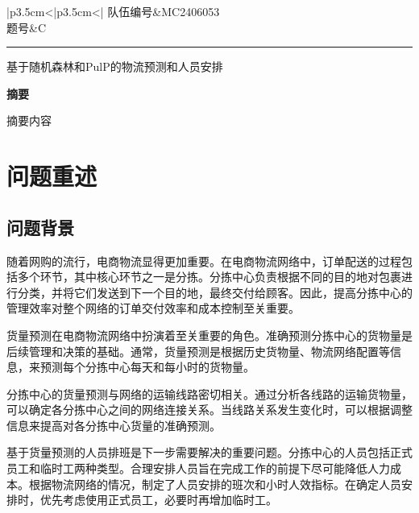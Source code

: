 \documentclass[UTF8,a4paper,10 pt]{article}%
\begin{document}
	\setlength{\lineskip}{8pt}
	\setlength{\lineskiplimit}{8pt}
    
\begin{table}[!ht]
    \renewcommand\arraystretch{1.5}
    \centering  
    \begin{tabular}{|p{3.5cm}<{\centering}|p{3.5cm}<{\centering}|}
        \hline
        {队伍编号}&MC2406053\\
        \hline
        题号&C\\
        \hline        
    \end{tabular}
\end{table}

\setcounter{page}{1}

\noindent\rule{\linewidth}{1pt}
\begin{center}
    \Large 基于随机森林和PulP的物流预测和人员安排
\end{center}
\begin{center}
    \large\bf 摘要
\end{center}

摘要内容



\newpage

\tableofcontents


\newpage
\setcounter{page}{1}


\section{问题重述}
\subsection{问题背景}
随着网购的流行，电商物流显得更加重要。在电商物流网络中，订单配送的过程包括多个环节，其中核心环节之一是分拣。分拣中心负责根据不同的目的地对包裹进行分类，并将它们发送到下一个目的地，最终交付给顾客。因此，提高分拣中心的管理效率对整个网络的订单交付效率和成本控制至关重要。

货量预测在电商物流网络中扮演着至关重要的角色。准确预测分拣中心的货物量是后续管理和决策的基础。通常，货量预测是根据历史货物量、物流网络配置等信息，来预测每个分拣中心每天和每小时的货物量。

分拣中心的货量预测与网络的运输线路密切相关。通过分析各线路的运输货物量，可以确定各分拣中心之间的网络连接关系。当线路关系发生变化时，可以根据调整信息来提高对各分拣中心货量的准确预测。

基于货量预测的人员排班是下一步需要解决的重要问题。分拣中心的人员包括正式员工和临时工两种类型。合理安排人员旨在完成工作的前提下尽可能降低人力成本。根据物流网络的情况，制定了人员安排的班次和小时人效指标。在确定人员安排时，优先考虑使用正式员工，必要时再增加临时工。
\end{document}
